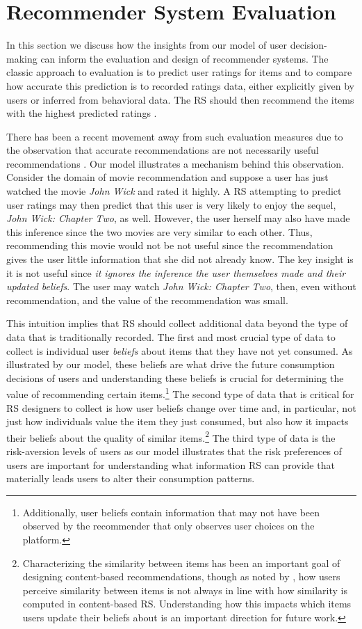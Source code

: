 \documentclass[manuscript]{acmart}
\begin{document}
\section{Recommender System Evaluation}
In this section we discuss how the insights from our model of user decision-making can inform the evaluation and design of recommender systems. The classic approach to evaluation is to predict user ratings for items and to compare how accurate this prediction is to recorded ratings data, either explicitly given by users or inferred from behavioral data. The RS should then recommend the items with the highest predicted ratings \cite{adomavicius2005toward}.
\par
There has been a recent movement away from such evaluation measures due to the observation that accurate recommendations are not necessarily useful recommendations \cite{mcnee2006being}. Our model illustrates a mechanism behind this observation. Consider the domain of movie recommendation and suppose a user has just watched the movie \textit{John Wick} and rated it highly. A RS attempting to predict user ratings may then predict that this user is very likely to enjoy the sequel, \textit{John Wick: Chapter Two}, as well. However, the user herself may also have made this inference since the two movies are very similar to each other. Thus, recommending this movie would not be not useful since the recommendation gives the user little information that she did not already know. The key insight is it is not useful since \textit{it ignores the inference the user themselves made and their updated beliefs}. The user may watch \textit{John Wick: Chapter Two}, then, even without recommendation, and the value of the recommendation was small.
\par
This intuition implies that RS should collect additional data beyond the type of data that is traditionally recorded. The first and most crucial type of data to collect is individual user \textit{beliefs} about items that they have not yet consumed. As illustrated by our model, these beliefs are what drive the future consumption decisions of users and understanding these beliefs is crucial for determining the value of recommending certain items.\footnote{Additionally, user beliefs contain information that may not have been observed by the recommender that only observes user choices on the platform.} The second type of data that is critical for RS designers to collect is how user beliefs change over time and, in particular, not just how individuals value the item they just consumed, but also how it impacts their beliefs about the quality of similar items.\footnote{Characterizing the similarity between items has been an important goal of designing content-based recommendations, though as noted by \cite{winecoff2019users}, how users perceive similarity between items is not always in line with how similarity is computed in content-based RS. Understanding how this impacts which items users update their beliefs about is an important direction for future work.} The third type of data is the risk-aversion levels of users as our model illustrates that the risk preferences of users are important for understanding what information RS can provide that materially leads users to alter their consumption patterns.
\end{document}
